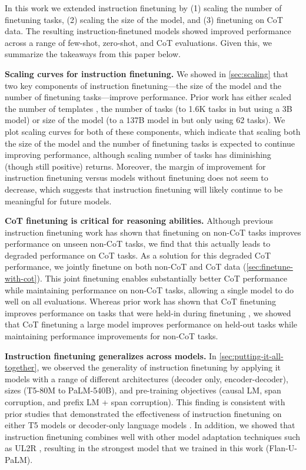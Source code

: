 In this work we extended instruction finetuning by (1) scaling the number of finetuning tasks, (2) scaling the size of the model, and (3) finetuning on CoT data. The resulting instruction-finetuned models showed improved performance across a range of few-shot, zero-shot, and CoT evaluations. Given this, we summarize the takeaways from this paper below.

\textbf{Scaling curves for instruction finetuning.} We showed in \ref{sec:scaling} that two key components of instruction finetuning---the size of the model and the number of finetuning tasks---improve performance. Prior work has either scaled the number of templates \citep{puri2022many}, the number of tasks (to 1.6K tasks in \citet{wang2022benchmarking} but using a 3B model) or size of the model (to a 137B model in \citet{wei2021finetuned} but only using 62 tasks). We plot scaling curves for both of these components, which indicate that scaling both the size of the model and the number of finetuning tasks is expected to continue improving performance, although scaling number of tasks has diminishing (though still positive) returns. Moreover, the margin of improvement for instruction finetuning versus models without finetuning does not seem to decrease, which suggests that instruction finetuning will likely continue to be meaningful for future models.

\textbf{CoT finetuning is critical for reasoning abilities.} Although previous instruction finetuning work has shown that finetuning on non-CoT tasks improves performance on unseen non-CoT tasks, we find that this actually leads to degraded performance on CoT tasks. As a solution for this degraded CoT performance, we jointly finetune on both non-CoT and CoT data (\ref{sec:finetune-with-cot}). 
This joint finetuning enables substantially better CoT performance while maintaining performance on non-CoT tasks, allowing a single model to do well on all evaluations. Whereas prior work has shown that CoT finetuning improves performance on tasks that were held-in during finetuning \citep[][\textit{inter alia}]{ling-etal-2017-program,cobbe2021training,zelikman2022star,huang2023selfimprove}, we showed that CoT finetuning a large model improves performance on held-out tasks while maintaining performance improvements for non-CoT tasks.

\textbf{Instruction finetuning generalizes across models.} In \ref{sec:putting-it-all-together}, we observed the generality of instruction finetuning by applying it models with a range of different architectures (decoder only, encoder-decoder), sizes (T5-80M to PaLM-540B), and pre-training objectives (causal LM, span corruption, and prefix LM + span corruption). This finding is consistent with prior studies that demonstrated the effectiveness of instruction finetuning on either T5 models \citep{sanh2021multitask,wang2022benchmarking,scialom2022continual} or decoder-only language models \citep{wei2021finetuned,ouyang2022training}. In addition, we showed that instruction finetuning combines well with other model adaptation techniques such as UL2R \citep{tay2022transcending}, resulting in the strongest model that we trained in this work (Flan-U-PaLM).

